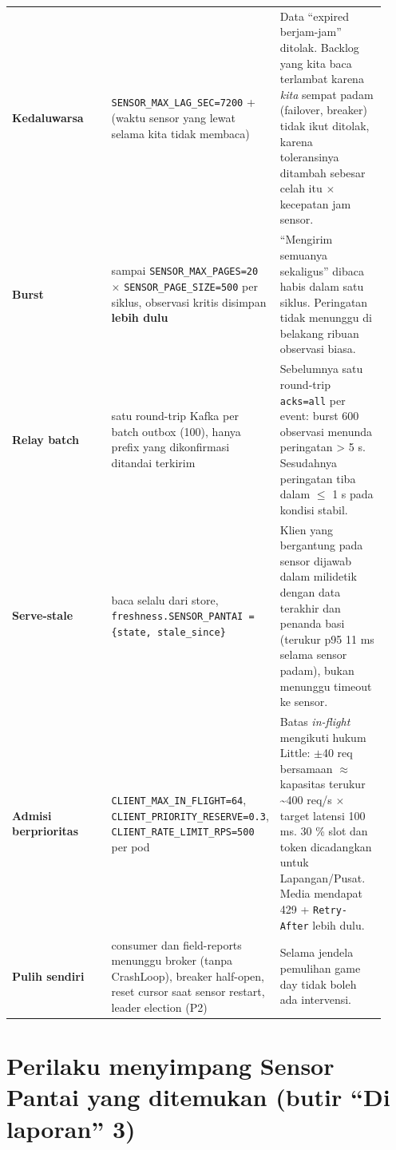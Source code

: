 {\begin{longtable}{@{}>{\raggedright\arraybackslash}p{0.311\linewidth}>{\raggedright\arraybackslash}p{0.311\linewidth}>{\raggedright\arraybackslash}p{0.311\linewidth}@{}}
\textbf{Kedaluwarsa} & \texttt{SENSOR\_\allowbreak{}MAX\_\allowbreak{}LAG\_\allowbreak{}SEC=\allowbreak{}7200} + (waktu sensor yang lewat selama kita tidak membaca) & Data ``expired berjam-jam'' ditolak. Backlog yang kita baca terlambat karena \emph{kita} sempat padam (failover, breaker) tidak ikut ditolak, karena toleransinya ditambah sebesar celah itu $\times$ kecepatan jam sensor. \\
\textbf{Burst} & sampai \texttt{SENSOR\_\allowbreak{}MAX\_\allowbreak{}PAGES=\allowbreak{}20} $\times$ \texttt{SENSOR\_\allowbreak{}PAGE\_\allowbreak{}SIZE=\allowbreak{}500} per siklus, observasi kritis disimpan \textbf{lebih dulu} & ``Mengirim semuanya sekaligus'' dibaca habis dalam satu siklus. Peringatan tidak menunggu di belakang ribuan observasi biasa. \\
\textbf{Relay batch} & satu round-trip Kafka per batch outbox (100), hanya prefix yang dikonfirmasi ditandai terkirim & Sebelumnya satu round-trip \texttt{acks=\allowbreak{}all} per event: burst 600 observasi menunda peringatan > 5 s. Sesudahnya peringatan tiba dalam $\le$ 1 s pada kondisi stabil. \\
\textbf{Serve-stale} & baca selalu dari store, \texttt{freshness.\allowbreak{}SENSOR\_\allowbreak{}PANTAI =\allowbreak{} \{state,\allowbreak{} stale\_\allowbreak{}since\}} & Klien yang bergantung pada sensor dijawab dalam milidetik dengan data terakhir dan penanda basi (terukur p95 11 ms selama sensor padam), bukan menunggu timeout ke sensor. \\
\textbf{Admisi berprioritas} & \texttt{CLIENT\_\allowbreak{}MAX\_\allowbreak{}IN\_\allowbreak{}FLIGHT=\allowbreak{}64}, \texttt{CLIENT\_\allowbreak{}PRIORITY\_\allowbreak{}RESERVE=\allowbreak{}0.\allowbreak{}3}, \texttt{CLIENT\_\allowbreak{}RATE\_\allowbreak{}LIMIT\_\allowbreak{}RPS=\allowbreak{}500} per pod & Batas \emph{in-flight} mengikuti hukum Little: $\pm$40 req bersamaan $\approx$ kapasitas terukur \textasciitilde{}400 req/s $\times$ target latensi 100 ms. 30 \% slot dan token dicadangkan untuk Lapangan/Pusat. Media mendapat 429 + \texttt{Retry-\allowbreak{}After} lebih dulu. \\
\textbf{Pulih sendiri} & consumer dan field-reports menunggu broker (tanpa CrashLoop), breaker half-open, reset cursor saat sensor restart, leader election (P2) & Selama jendela pemulihan game day tidak boleh ada intervensi. \\
\bottomrule
\end{longtable}
}

\section{Perilaku menyimpang Sensor Pantai yang ditemukan (butir ``Di laporan'' 3)}

